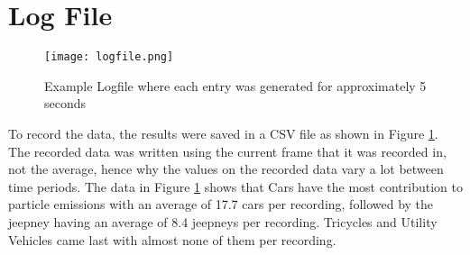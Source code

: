 \newpage
\section{Log File}
\begin{figure}[h!]
	\texttt{[image: logfile.png]}
	\caption{Example Logfile where each entry was generated for approximately 5 seconds}
	\label{fig:logfile}
\end{figure}

To record the data, the results were saved in a CSV file as shown in Figure \ref{fig:logfile}. The recorded data was written using the current frame that it was recorded in, not the average, hence why the values on the recorded data vary a lot between time periods. The data in Figure \ref{fig:logfile} shows that Cars have the most contribution to particle emissions with an average of 17.7 cars per recording, followed by the jeepney having an average of 8.4 jeepneys per recording. Tricycles and Utility Vehicles came last with almost none of them per recording.




